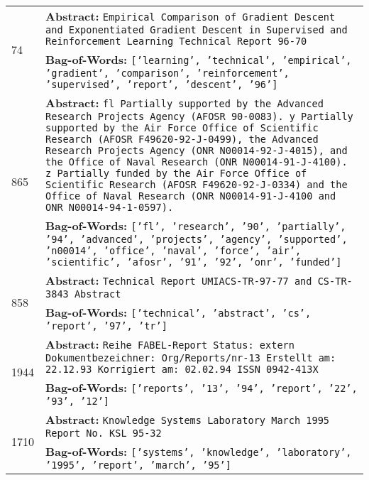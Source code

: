 \begin{table}[!h]
{\begin{tabular}{p{1cm} p{12cm}}
             \midrule
             
             \multirow{2}{*}{74} & \textbf{Abstract:} {\tt Empirical Comparison of Gradient Descent and Exponentiated Gradient Descent in Supervised and Reinforcement Learning Technical Report 96-70} \\
             & \textbf{Bag-of-Words:} {\tt ['learning', 'technical', 'empirical', 'gradient', 'comparison', 'reinforcement', 'supervised', 'report', 'descent', '96']} \\
             
             \midrule
             
             \multirow{2}{*}{865} & \textbf{Abstract:} {\tt fl Partially supported by the Advanced Research Projects Agency (AFOSR 90-0083). y Partially supported by the Air Force Office of Scientific Research (AFOSR F49620-92-J-0499), the Advanced Research Projects Agency (ONR N00014-92-J-4015), and the Office of Naval Research (ONR N00014-91-J-4100). z Partially funded by the Air Force Office of Scientific Research (AFOSR F49620-92-J-0334) and the Office of Naval Research (ONR N00014-91-J-4100 and ONR N00014-94-1-0597).} \\ 
             & \textbf{Bag-of-Words:} {\tt ['fl', 'research', '90', 'partially', '94', 'advanced', 'projects', 'agency', 'supported', 'n00014', 'office', 'naval', 'force', 'air', 'scientific', 'afosr', '91', '92', 'onr', 'funded']} \\
             
             \midrule
             
             \multirow{2}{*}{858} &  \textbf{Abstract:} {\tt Technical Report UMIACS-TR-97-77 and CS-TR-3843 Abstract} \\
             & \textbf{Bag-of-Words:} {\tt ['technical', 'abstract', 'cs', 'report', '97', 'tr']} \\
             
             \midrule
             
             \multirow{2}{*}{1944} &  \textbf{Abstract:} {\tt Reihe FABEL-Report Status: extern Dokumentbezeichner: Org/Reports/nr-13 Erstellt am: 22.12.93 Korrigiert am: 02.02.94 ISSN 0942-413X} \\
             & \textbf{Bag-of-Words:} {\tt ['reports', '13', '94', 'report', '22', '93', '12']} \\
             
             \midrule
             
             \multirow{2}{*}{1710} & \textbf{Abstract:} {\tt Knowledge Systems Laboratory March 1995 Report No. KSL 95-32} \\
             & \textbf{Bag-of-Words:} {\tt ['systems', 'knowledge', 'laboratory', '1995', 'report', 'march', '95']} \\
             

\end{tabular}}
\end{table}

